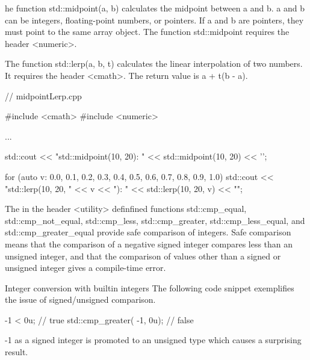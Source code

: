 he function std::midpoint(a, b) calculates the midpoint between a and b. a and b can be integers, floating-point numbers, or pointers. If a and b are pointers, they must point to the same array object.
The function std::midpoint requires the header <numeric>.

The function std::lerp(a, b, t) calculates the linear interpolation of two numbers. It requires the header <cmath>. The return value is a + t(b - a).



\begin{cpp}
// midpointLerp.cpp

#include <cmath>
#include <numeric>

...

std::cout << "std::midpoint(10, 20): " << std::midpoint(10, 20) << '\n';

for (auto v: {0.0, 0.1, 0.2, 0.3, 0.4, 0.5, 0.6, 0.7, 0.8, 0.9, 1.0}) {
	std::cout << "std::lerp(10, 20, " << v << "): " << std::lerp(10, 20, v) << "\n";
}
\end{cpp}





The in the header <utility> definfined functions std::cmp\_equal, std::cmp\_not\_equal, std::cmp\_less, std::cmp\_greater, std::cmp\_less\_equal, and std::cmp\_greater\_equal provide safe comparison of integers. Safe comparison means that the comparison of a negative signed integer compares less than an unsigned integer, and that the comparison of values other than a signed or unsigned integer gives a compile-time error.


\begin{myWarning}{Integer conversion with builtin integers}
The following code snippet exemplifies the issue of signed/unsigned comparison.

\begin{cpp}
-1 < 0u; // true
std::cmp_greater( -1, 0u); // false
\end{cpp}

-1 as a signed integer is promoted to an unsigned type which causes a surprising result.

\end{myWarning}
















